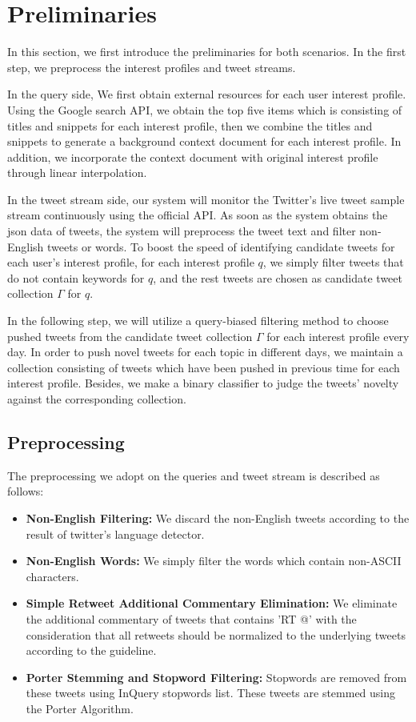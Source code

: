 \section{Preliminaries}
In this section, we first introduce the preliminaries for both scenarios.
In the first step, we preprocess the interest profiles and tweet streams. 

In the query side,
We first obtain external resources for each user interest profile.
Using the Google search API, 
we obtain the top five items which is consisting of titles and snippets for each interest profile,
then we combine the titles and snippets to generate a background context document for each interest profile.
In addition, we incorporate the context document with original interest profile through linear interpolation. 

In the tweet stream side,
our system will monitor the Twitter's live tweet sample stream continuously using the official API.
As soon as the system obtains the json data of tweets,
the system will preprocess the tweet text and filter non-English tweets or words.
To boost the speed of identifying candidate tweets for each user's interest profile, 
for each interest profile $q$, 
we simply filter tweets that do not contain keywords for $q$,
and the rest tweets are chosen as candidate tweet collection $\Gamma$ for $q$.

In the following step, we will utilize a query-biased filtering method to choose pushed tweets from the candidate tweet collection $\Gamma$ for each interest profile every day.
In order to push novel tweets for each topic in different days, we maintain a collection consisting of tweets which have been pushed in previous time for each interest profile. Besides, we make a binary classifier to judge the tweets' novelty against the corresponding collection.

\subsection{Preprocessing}
The preprocessing we adopt on the queries and tweet stream is described as follows:
\begin{itemize}
\item \textbf{Non-English Filtering:} We discard the non-English tweets according to the result of twitter's language detector.
\item \textbf{Non-English Words:} We simply filter the words which contain non-ASCII characters.
\item \textbf{Simple Retweet Additional Commentary Elimination:} We eliminate the additional commentary of tweets that contains 'RT @' with the consideration that all retweets should be normalized to the underlying tweets according to the guideline.
\item \textbf{Porter Stemming and Stopword Filtering:} Stopwords are removed from these tweets using InQuery stopwords list. These tweets are stemmed using the Porter Algorithm.
\end{itemize}

